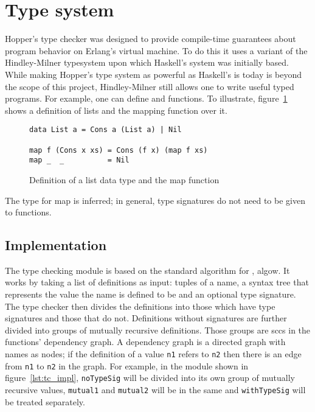 \section{Type system}
\label{sec:dai_tc}



Hopper's type checker was designed to provide compile-time guarantees about program behavior on Erlang's virtual machine. To do this it uses a variant of the Hindley-Milner \cite{TypeSchemes} \gls{typesystem} upon which Haskell's system was initially based. While making Hopper's type system as powerful as Haskell's is today is beyond the scope of this project, Hindley-Milner still allows one to write useful typed programs. For example, one can define  and functions. To illustrate, figure~\ref{lst:tc_map} shows a definition of lists and the mapping function over it. 

\begin{figure}[!htb]
\centering
\begin{minipage}[b]{0.68\linewidth}
\centering
\begin{lstlisting}
data List a = Cons a (List a) | Nil

map f (Cons x xs) = Cons (f x) (map f xs)
map _  _          = Nil
\end{lstlisting}
\end{minipage}
\caption{Definition of a list data type and the map function}
\label{lst:tc_map}
\end{figure}

The type for map is inferred; in general, type signatures do not need to be given to functions.

\subsection{Implementation}


The type checking module is based on the standard algorithm for , \Gls{algow}. It works by taking a list of definitions as input: tuples of a name, a syntax tree that represents the value the name is defined to be and an optional type signature. The type checker then divides the definitions into those which have type signatures and those that do not. Definitions without signatures are further divided into groups of mutually recursive definitions. Those groups are \glspl{scc} in the functions' dependency graph. A dependency graph is a directed graph with names as nodes; if the definition of a value \texttt{n1} refers to \texttt{n2} then there is an edge from \texttt{n1} to \texttt{n2} in the graph. For example, in the module shown in figure~\ref{lst:tc_impl}, \texttt{noTypeSig} will be divided into its own group of mutually recursive values, \texttt{mutual1} and \texttt{mutual2} will be in the same and \texttt{withTypeSig} will be treated separately. 

